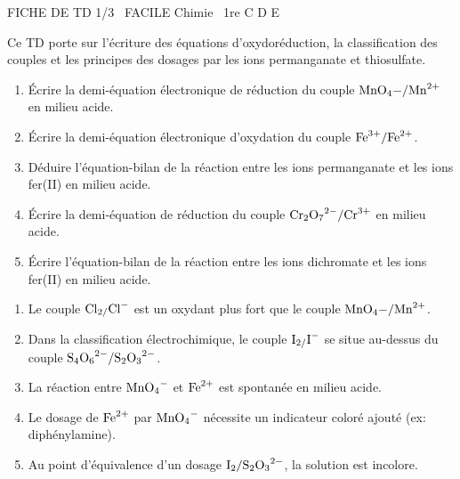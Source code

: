 \documentclass[11pt]{article}
\begin{document}
\begin{tcolorbox}[enhanced,colback=popink,colframe=popink,arc=10pt,boxrule=0pt,left=12pt,right=12pt,top=9pt,bottom=9pt]
{\color{white}\popxbold\small FICHE DE TD 1/3 \textbullet\ FACILE \hfill Chimie \textbullet\ 1re C D E\par}
\end{tcolorbox}
\vspace{4pt}
Ce TD porte sur l'écriture des équations d'oxydoréduction, la classification des couples et les principes des dosages par les ions permanganate et thiosulfate.

\begin{exercice}
\begin{enumerate}
    \item Écrire la demi-équation électronique de réduction du couple $\ce{MnO4-/Mn^{2+}}$ en milieu acide.
    \item Écrire la demi-équation électronique d'oxydation du couple $\ce{Fe^{3+}/Fe^{2+}}$.
    \item Déduire l'équation-bilan de la réaction entre les ions permanganate et les ions fer(II) en milieu acide.
    \item Écrire la demi-équation de réduction du couple $\ce{Cr2O7^{2-}/Cr^{3+}}$ en milieu acide.
    \item Écrire l'équation-bilan de la réaction entre les ions dichromate et les ions fer(II) en milieu acide.
\end{enumerate}
\end{exercice}

\begin{exercice}
\begin{enumerate}
    \item Le couple $\ce{Cl2/Cl-}$ est un oxydant plus fort que le couple $\ce{MnO4-/Mn^{2+}}$.
    \item Dans la classification électrochimique, le couple $\ce{I2/I-}$ se situe au-dessus du couple $\ce{S4O6^{2-}/S2O3^{2-}}$.
    \item La réaction entre $\ce{MnO4-}$ et $\ce{Fe^{2+}}$ est spontanée en milieu acide.
    \item Le dosage de $\ce{Fe^{2+}}$ par $\ce{MnO4-}$ nécessite un indicateur coloré ajouté (ex: diphénylamine).
    \item Au point d'équivalence d'un dosage $\ce{I2}/\ce{S2O3^{2-}}$, la solution est incolore.
\end{enumerate}
\end{exercice}
\end{document}
